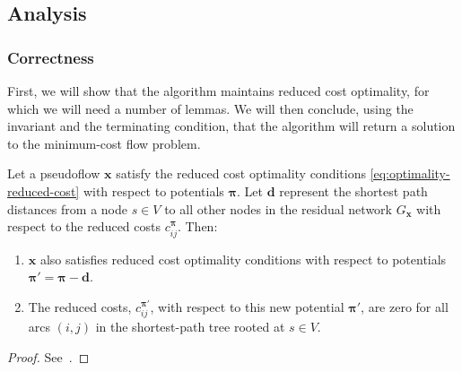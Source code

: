 \subsection{Analysis}

\subsubsection{Correctness}

First, we will show that the algorithm maintains reduced cost optimality, for which we will need a number of lemmas. We will then conclude, using the invariant and the terminating condition, that the algorithm will return a solution to the minimum-cost flow problem.\\

\begin{lemma} \label{lemma:ssp-reduced-costs}
Let a pseudoflow $\mathbf{x}$ satisfy the reduced cost optimality conditions \cref{eq:optimality-reduced-cost} with respect to potentials $\boldsymbol{\pi}$. Let $\mathbf{d}$ represent the shortest path distances from a node $s \in V$ to all other nodes in the residual network $G_{\mathbf{x}}$ with respect to the reduced costs $c^{\boldsymbol{\pi}}_{ij}$. Then:
    
\begin{enumerate}[label=(\alph*)]
  \item $\mathbf{x}$ also satisfies reduced cost optimality conditions with respect to potentials $\boldsymbol{\pi}' = \boldsymbol{\pi} - \mathbf{d}$.
  \item The reduced costs, $c^{\boldsymbol{\pi}'}_{ij}$, with respect to this new potential $\boldsymbol{\pi}'$, are zero for all arcs $(i,j)$ in the shortest-path tree rooted at $s \in V$.
\end{enumerate}
\end{lemma}
\begin{proof}
See~\cite[p.~320]{Ahuja:1993}.
\end{proof}

